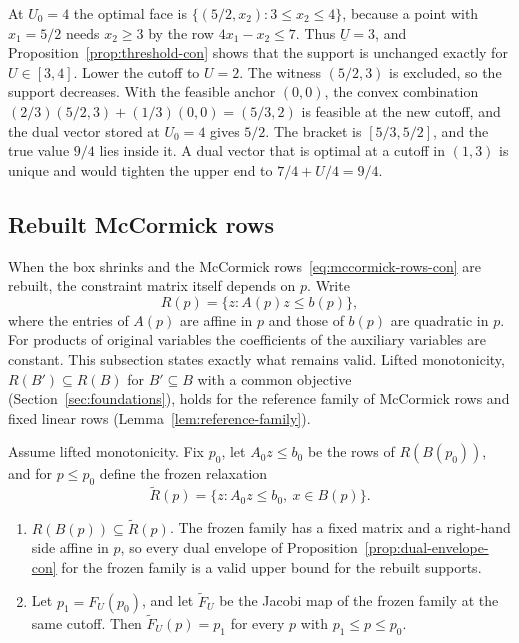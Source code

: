 \begin{example}\label{ex:cutoff-bracket-con}
At $U_0=4$ the optimal face is $\{(5/2,x_2):3\le x_2\le4\}$, because a
point with $x_1=5/2$ needs $x_2\ge3$ by the row $4x_1-x_2\le7$. Thus
$\underline U=3$, and Proposition~\ref{prop:threshold-con} shows that the
support is unchanged exactly for $U\in[3,4]$. Lower the cutoff to $U=2$.
The witness $(5/2,3)$ is excluded, so the support decreases. With the
feasible anchor $(0,0)$, the convex combination
$(2/3)(5/2,3)+(1/3)(0,0)=(5/3,2)$ is feasible at the new cutoff, and the
dual vector stored at $U_0=4$ gives $5/2$. The bracket is $[5/3,5/2]$, and
the true value $9/4$ lies inside it. A dual vector that is optimal at a
cutoff in $(1,3)$ is unique and would tighten the upper end to
$7/4+U/4=9/4$.
\end{example}

\subsection{Rebuilt McCormick rows}\label{sec:rebuilt-con}

When the box shrinks and the McCormick rows~\eqref{eq:mccormick-rows-con}
are rebuilt, the constraint matrix itself depends on $p$. Write
\[
 R(p)=\{z:A(p)z\le b(p)\},
\]
where the entries of $A(p)$ are affine in $p$ and those of $b(p)$ are
quadratic in $p$. For products of original variables the coefficients of
the auxiliary variables are constant. This subsection states exactly what
remains valid. Lifted monotonicity, $R(B')\subseteq R(B)$ for
$B'\subseteq B$ with a common objective (Section~\ref{sec:foundations}),
holds for the reference family of McCormick rows and fixed linear rows
(Lemma~\ref{lem:reference-family}).

\begin{lemma}\label{lem:frozen-con}
Assume lifted monotonicity. Fix $p_0$, let $A_0z\le b_0$ be the rows of
$R(B(p_0))$, and for $p\le p_0$ define the frozen relaxation
\[
 \widetilde R(p)=\{z:A_0z\le b_0,\ x\in B(p)\}.
\]
\begin{enumerate}
\item[(a)] $R(B(p))\subseteq\widetilde R(p)$. The frozen family has a fixed
 matrix and a right-hand side affine in $p$, so every dual envelope of
 Proposition~\ref{prop:dual-envelope-con} for the frozen family is a valid
 upper bound for the rebuilt supports.
\item[(b)] Let $p_1=F_U(p_0)$, and let $\widetilde F_U$ be the Jacobi map of
 the frozen family at the same cutoff. Then $\widetilde F_U(p)=p_1$ for
 every $p$ with $p_1\le p\le p_0$.
\end{enumerate}
\end{lemma}

